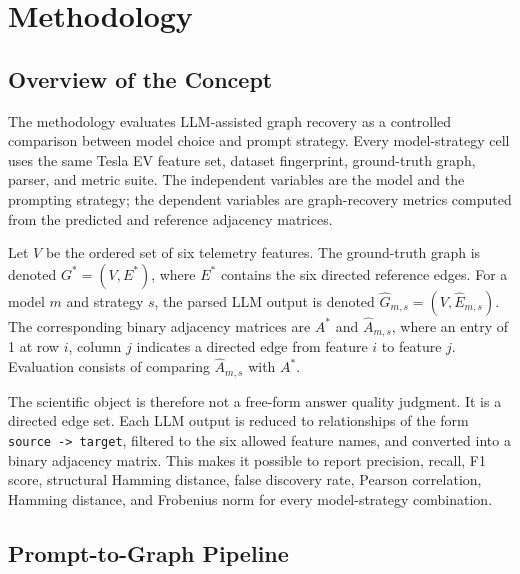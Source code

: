 \chapter{Methodology}
\label{sec:methodology}

\section{Overview of the Concept}
\label{sec:research-design}

The methodology evaluates LLM-assisted graph recovery as a controlled
comparison between model choice and prompt strategy. Every model-strategy cell
uses the same Tesla EV feature set, dataset fingerprint, ground-truth graph,
parser, and metric suite. The independent variables are the model and the
prompting strategy; the dependent variables are graph-recovery metrics
computed from the predicted and reference adjacency matrices.

Let \(V\) be the ordered set of six telemetry features. The ground-truth graph
is denoted \(G^\ast=(V,E^\ast)\), where \(E^\ast\) contains the six directed
reference edges. For a model \(m\) and strategy \(s\), the parsed LLM output is
denoted \(\hat{G}_{m,s}=(V,\hat{E}_{m,s})\). The corresponding binary
adjacency matrices are \(A^\ast\) and \(\hat{A}_{m,s}\), where an entry of 1
at row \(i\), column \(j\) indicates a directed edge from feature \(i\) to
feature \(j\). Evaluation consists of comparing \(\hat{A}_{m,s}\) with
\(A^\ast\).

The scientific object is therefore not a free-form answer quality judgment. It
is a directed edge set. Each LLM output is reduced to relationships of the
form \texttt{source -> target}, filtered to the six allowed feature names, and
converted into a binary adjacency matrix. This makes it possible to report
precision, recall, F1 score, structural Hamming distance, false discovery
rate, Pearson correlation, Hamming distance, and Frobenius norm for every
model-strategy combination.


\section{Prompt-to-Graph Pipeline}

